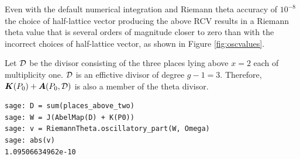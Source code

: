 \begin{example}
Even with the default numerical integration and Riemann theta accuracy of
$10^{-8}$ the choice of half-lattice vector producing the above RCV results in a
Riemann theta value that is several orders of magnitude closer to zero than with
the incorrect choices of half-lattice vector, as shown in Figure
\ref{fig:oscvalues}.

Let $\operatorname{\mathcal{D}}$ be the divisor consisting of the three places lying above $x=2$ each
of multiplicity one. $\operatorname{\mathcal{D}}$ is an effictive divisor of degree $g-1 = 3$.
Therefore, $\operatorname{\boldsymbol{K}}(P_0) + \operatorname{\boldsymbol{A}}(P_0,\operatorname{\mathcal{D}})$ is also a member of the theta divisor.
\begin{lstlisting}
sage: D = sum(places_above_two)
sage: W = J(AbelMap(D) + K(P0))
sage: v = RiemannTheta.oscillatory_part(W, Omega)
sage: abs(v)
1.09506634962e-10
\end{lstlisting}
\end{example}



